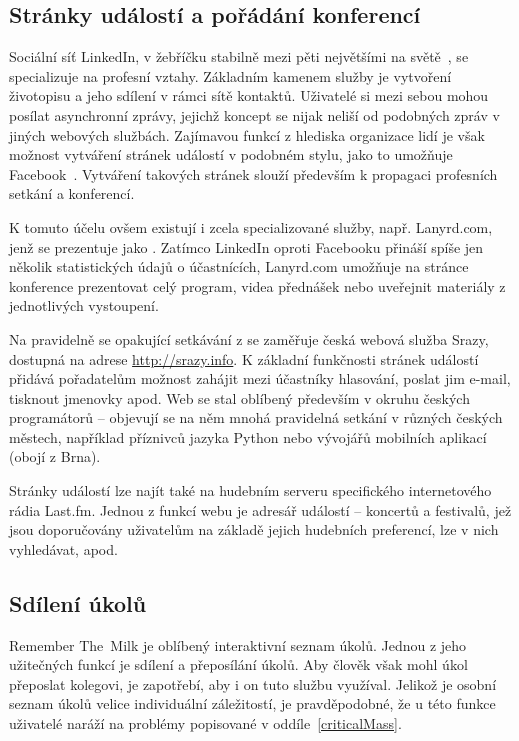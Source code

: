 \documentclass[12pt,oneside,final]{fithesis2}
\begin{document}
\subsection{Stránky událostí a pořádání konferencí}
Sociální síť LinkedIn, v žebříčku stabilně mezi pěti největšími na světě~\cite{kazeniac2009social}, se specializuje na profesní vztahy. Základním kamenem služby je vytvoření životopisu a jeho sdílení v rámci sítě kontaktů. Uživatelé si mezi sebou mohou posílat asynchronní zprávy, jejichž koncept se nijak neliší od podobných zpráv v jiných webových službách. Zajímavou funkcí z hlediska organizace lidí je však možnost vytváření stránek událostí v podobném stylu, jako to umožňuje Facebook~\cite{linkedin2011networking}. Vytváření takových stránek slouží především k propagaci profesních setkání a konferencí.

K tomuto účelu ovšem existují i zcela specializované služby, např. Lanyrd.com, jenž se prezentuje jako . Zatímco LinkedIn oproti Facebooku přináší spíše jen několik statistických údajů o účastnících, Lanyrd.com umožňuje na stránce konference prezentovat celý program, videa přednášek nebo uveřejnit materiály z jednotlivých vystoupení.

Na pravidelně se opakující setkávání z se zaměřuje česká webová služba Srazy, dostupná na adrese \url{http://srazy.info}. K základní funkčnosti stránek událostí přidává pořadatelům možnost zahájit mezi účastníky hlasování, poslat jim e-mail, tisknout jmenovky apod. Web se stal oblíbený především v okruhu českých programátorů -- objevují se na něm mnohá pravidelná setkání v různých českých městech, například příznivců jazyka Python nebo vývojářů mobilních aplikací (obojí z Brna).

Stránky událostí lze najít také na hudebním serveru specifického internetového rádia Last.fm. Jednou z funkcí webu je adresář událostí -- koncertů a festivalů, jež jsou doporučovány uživatelům na základě jejich hudebních preferencí, lze v nich vyhledávat, apod.

\subsection{Sdílení úkolů}
Remember The~Milk je oblíbený interaktivní seznam úkolů. Jednou z jeho užitečných funkcí je sdílení a přeposílání úkolů. Aby člověk však mohl úkol přeposlat kolegovi, je zapotřebí, aby i on tuto službu využíval. Jelikož je osobní seznam úkolů velice individuální záležitostí, je pravděpodobné, že u této funkce uživatelé naráží na problémy popisované v oddíle~\ref{criticalMass}.
\end{document}
